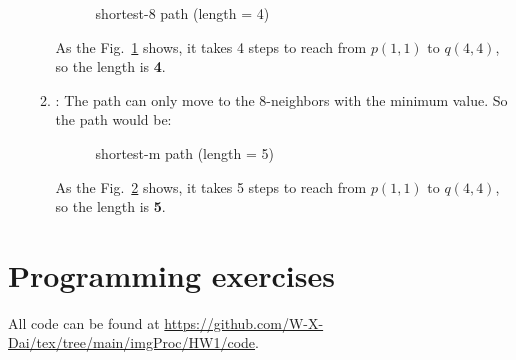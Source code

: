 \documentclass[12pt,a4paper]{article}
\begin{document}
\begin{enumerate}
\begin{enumerate}
\begin{figure}[H]
            \centering
            
            \caption{shortest-8 path (length = 4)}
            \label{fig:2a_s8}
        \end{figure}
        As the Fig.~\ref{fig:2a_s8} shows, it takes 4 steps to reach from $p(1, 1)$ to $q(4, 4)$,\\ so the length is \textbf{4}.
        \newpage
        \item {}: The path can only move to the 8-neighbors with the minimum value. So the path would be:
        \begin{figure}[H]
            \centering
            
            \caption{shortest-m path (length = 5)}
            \label{fig:2a_sm}
        \end{figure}
        As the Fig.~\ref{fig:2a_sm} shows, it takes 5 steps to reach from $p(1, 1)$ to $q(4, 4)$,\\ so the length is \textbf{5}.
    \end{enumerate}
\end{enumerate}

\newpage
\section{Programming exercises}

All code can be found at \url{https://github.com/W-X-Dai/tex/tree/main/imgProc/HW1/code}.
\end{document}
